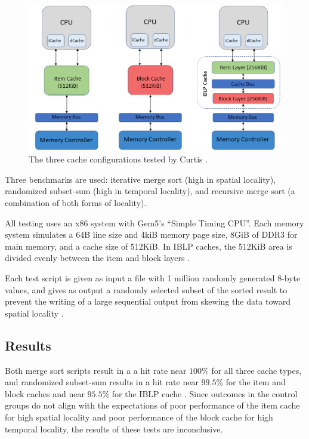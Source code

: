\documentclass[12pt,twoside]{reedthesis}
\begin{document}
	\vfill
	\begin{figure}[h]
		\centering
		\includegraphics[width=5in]{figures/curtis_caches.png}
		\caption{The three cache configurations tested by Curtis \cite{curtis}.}
	\end{figure}
	\vfill

	Three benchmarks are used: iterative merge sort (high in spatial locality), randomized subset-sum (high in temporal locality), and recursive merge sort (a combination of both forms of locality).
	
	All testing uses an x86 system with Gem5's ``Simple Timing CPU''. Each memory system simulates a 64B line size and 4kiB memory page size, 8GiB of DDR3 for main memory, and a cache size of 512KiB. In IBLP caches, the 512KiB area is divided evenly between the item and block layers \cite{curtis}.

	Each test script is given as input a file with 1 million randomly generated 8-byte values, and gives as output a randomly selected subset of the sorted result to prevent the writing of a large sequential output from skewing the data toward spatial locality \cite{curtis}.

	\subsection*{Results}

	Both merge sort scripts result in a a hit rate near $100\%$ for all three cache types, and randomized subset-sum results in a hit rate near $99.5\%$ for the item and block caches and near $95.5\%$ for the IBLP cache \cite{curtis}. Since outcomes in the control groups do not align with the expectations of poor performance of the item cache for high spatial locality and poor performance of the block cache for high temporal locality, the results of these tests are inconclusive.
\end{document}
